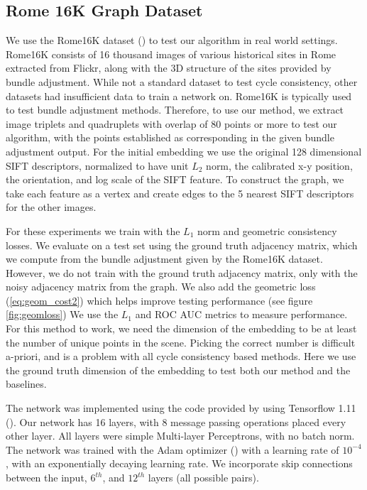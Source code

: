 \documentclass{article} %
\begin{document}
\subsection{Rome 16K Graph Dataset}
We  use the Rome16K dataset (\cite{li2010location}) to test our algorithm in real world settings.
Rome16K consists of 16 thousand images of various historical sites in Rome extracted from Flickr, along with the 3D structure of the sites provided by bundle adjustment.
While not a standard dataset to test cycle consistency, other datasets had insufficient data to train a network on.
Rome16K is typically used to test bundle adjustment methods.
Therefore, to use our method, we extract image triplets and quadruplets with overlap of 80 points or more to test our algorithm, with the points established as corresponding in the given bundle adjustment output.
For the initial embedding we use the original 128 dimensional SIFT descriptors, normalized to have unit $L_2$ norm, the calibrated x-y position, the orientation, and log scale of the SIFT feature.
To construct the graph, we take each feature as a vertex and create edges to the 5 nearest SIFT descriptors for the other images.

For these experiments we train with the $L_1$ norm and geometric consistency losses.
We evaluate on a test set using the ground truth adjacency matrix, which we compute from the bundle adjustment given by the Rome16K dataset.
However, we do not train with the ground truth adjacency matrix, only with the noisy adjacency matrix from the graph.
We also add the geometric loss (\ref{eq:geom_cost2}) which helps improve testing performance (see figure \ref{fig:geomloss})
We use the $L_1$ and ROC AUC metrics to measure performance.
For this method to work, we need the dimension of the embedding to be at least the number of unique points in the scene.
Picking the correct number is difficult a-priori, and is a problem with all cycle consistency based methods.
Here we use the ground truth dimension of the embedding to test both our method and the baselines.

The network was implemented using the code provided by \cite{battaglia2018relational} using Tensorflow 1.11 (\cite{tensorflow2015}).
Our network has 16 layers, with 8 message passing operations placed every other layer.
All layers were simple Multi-layer Perceptrons, with no batch norm.
The network was trained with the Adam optimizer (\cite{kingma2014adam}) with a learning rate of $10^{-4}$, with an exponentially decaying learning rate.
We incorporate skip connections between the input, $6^{th}$, and $12^{th}$ layers (all possible pairs). 
\end{document}
